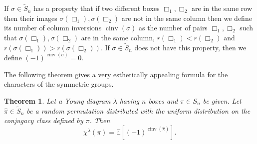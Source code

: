 \documentclass[12pt]{amsart}
\theoremstyle{plain}
\newtheorem{theorem}[lemma]{Theorem}
\newtheorem{proposition}[lemma]{Proposition}
\theoremstyle{remark}
\newcommand{\E}{\mathbb{E}}
\DeclareMathOperator{\inv}{cinv}
\begin{document}

If $\sigma\in \tilde{S}_n$ 
has a property that if two different boxes $\Box_1,\Box_2$ 
are in the same row
then their images $\sigma(\Box_1),\sigma(\Box_2)$ are not in the same column 
then
we define its number of column inversions $\inv(\sigma)$
as the number of pairs $\Box_1,\Box_2$ such that
$\sigma(\Box_1),\sigma(\Box_2)$ are in the same column, $r(\Box_1)<r(\Box_2)$ and
$r(\sigma(\Box_1))>r(\sigma(\Box_2))$. If $\sigma\in \tilde{S}_n$ does not have
this property, then we define $(-1)^{\inv (\sigma)}=0$.

The following theorem gives a very esthetically appealing formula for the
characters of the symmetric groups.


\begin{theorem}
\label{theo:bubu}
Let a Young diagram $\lambda$ having $n$ boxes and $\pi\in S_n$ be given. Let $\hat{\pi}\in \tilde{S}_n$ be a random permutation
distributed with the
uniform distribution on the conjugacy class defined by $\pi$. Then
$$ \chi^{\lambda}(\pi)= \E [(-1)^{\inv(\hat{\pi})}].$$
\end{theorem}
\end{document}
